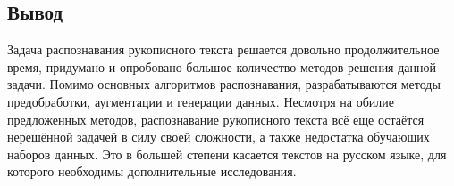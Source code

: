 \subsection{Вывод}

Задача распознавания рукописного текста решается довольно продолжительное время,
придумано и опробовано большое количество методов решения данной задачи.
Помимо основных алгоритмов распознавания, разрабатываются методы предобработки, аугментации и генерации данных.
Несмотря на обилие предложенных методов, распознавание рукописного текста всё еще остаётся нерешённой задачей в силу
своей сложности, а также недостатка обучающих наборов данных.
Это в большей степени касается текстов на русском языке, для которого необходимы дополнительные исследования.